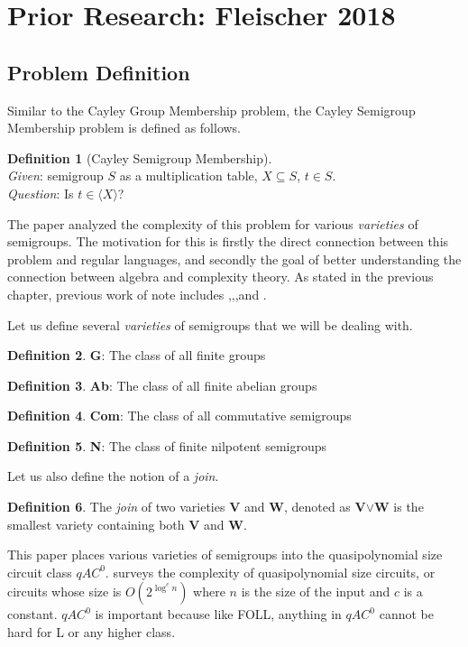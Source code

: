 \documentclass[a4paper,12pt]{article}
\theoremstyle{plain}
\theoremstyle{definition}
\newtheorem{defn}{Definition}
\theoremstyle{remark}
\begin{document}
\section{Prior Research: Fleischer 2018}
\cite{Fleischer2018}
\subsection{Problem Definition}
Similar to the Cayley Group Membership problem, the Cayley Semigroup Membership problem is defined as follows.
\begin{defn}[Cayley Semigroup Membership]
  ~\\
  \textit{Given}: semigroup $S$ as a multiplication table, $X\subseteq S$, $t\in S$. \\
  \textit{Question}: Is $t\in\langle X\rangle$?
\end{defn}
The paper analyzed the complexity of this problem for various \textit{varieties} of semigroups. The motivation for this is firstly the direct connection between this problem and regular languages, and secondly the goal of better understanding the connection between algebra and complexity theory. As stated in the previous chapter, previous work of note includes \cite{10.1145/800119.803883},\cite{Jones1976},\cite{Barrington1991},and \cite{Barrington2001}. \vspace{\baselineskip}

Let us define several \textit{varieties} of semigroups that we will be dealing with.
\begin{defn}
  \textbf{G}: The class of all finite groups
\end{defn}
\begin{defn}
  \textbf{Ab}: The class of all finite abelian groups
\end{defn}
\begin{defn}
  \textbf{Com}: The class of all commutative semigroups
\end{defn}
\begin{defn}
  \textbf{N}: The class of finite nilpotent semigroups
\end{defn}

Let us also define the notion of a \textit{join}.
\begin{defn}
  The \textit{join} of two varieties \textbf{V} and \textbf{W}, denoted as \textbf{V}$\lor$\textbf{W} is the smallest variety containing both \textbf{V} and \textbf{W}.
\end{defn}

This paper places various varieties of semigroups into the quasipolynomial size circuit class $qAC^0$. \cite{215383} surveys the complexity of quasipolynomial size circuits, or circuits whose size is $O(2^{\log^cn})$ where $n$ is the size of the input and $c$ is a constant. $qAC^0$ is important because like FOLL, anything in $qAC^0$ cannot be hard for L or any higher class.
\end{document}
